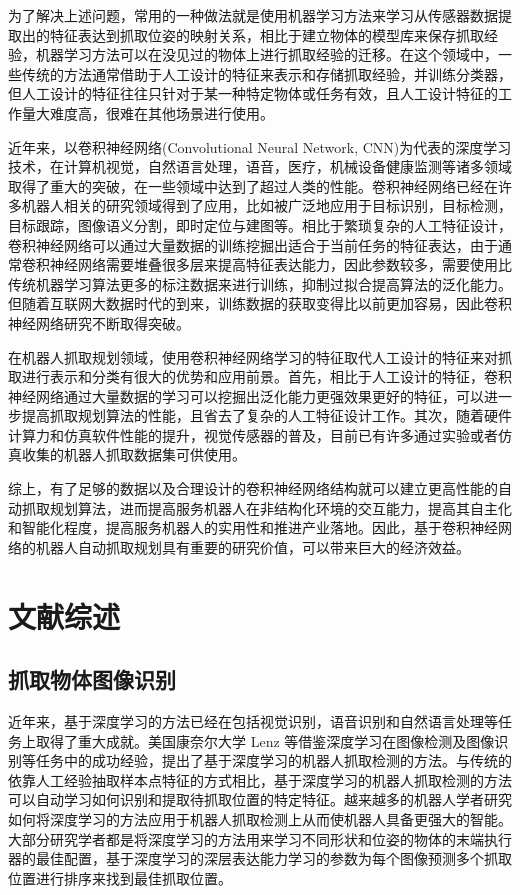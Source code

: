\documentclass[no-math,bwprint]{YangThesis}
\begin{document}
为了解决上述问题，常用的一种做法就是使用机器学习方法来学习从传感器数据提取出的特征表达到抓取位姿的映射关系，相比于建立物体的模型库来保存抓取经验，机器学习方法可以在没见过的物体上进行抓取经验的迁移。在这个领域中，一些传统的方法通常借助于人工设计的特征来表示和存储抓取经验，并训练分类器，但人工设计的特征往往只针对于某一种特定物体或任务有效，且人工设计特征的工作量大难度高，很难在其他场景进行使用。
 
近年来，以卷积神经网络(Convolutional Neural Network, CNN)为代表的深度学习技术，在计算机视觉，自然语言处理，语音，医疗，机械设备健康监测等诸多领域取得了重大的突破，在一些领域中达到了超过人类的性能。卷积神经网络已经在许多机器人相关的研究领域得到了应用，比如被广泛地应用于目标识别，目标检测，目标跟踪，图像语义分割，即时定位与建图等。相比于繁琐复杂的人工特征设计，卷积神经网络可以通过大量数据的训练挖掘出适合于当前任务的特征表达，由于通常卷积神经网络需要堆叠很多层来提高特征表达能力，因此参数较多，需要使用比传统机器学习算法更多的标注数据来进行训练，抑制过拟合提高算法的泛化能力。但随着互联网大数据时代的到来，训练数据的获取变得比以前更加容易，因此卷积神经网络研究不断取得突破。

在机器人抓取规划领域，使用卷积神经网络学习的特征取代人工设计的特征来对抓取进行表示和分类有很大的优势和应用前景。首先，相比于人工设计的特征，卷积神经网络通过大量数据的学习可以挖掘出泛化能力更强效果更好的特征，可以进一步提高抓取规划算法的性能，且省去了复杂的人工特征设计工作。其次，随着硬件计算力和仿真软件性能的提升，视觉传感器的普及，目前已有许多通过实验或者仿真收集的机器人抓取数据集可供使用。
 
综上，有了足够的数据以及合理设计的卷积神经网络结构就可以建立更高性能的自动抓取规划算法，进而提高服务机器人在非结构化环境的交互能力，提高其自主化和智能化程度，提高服务机器人的实用性和推进产业落地。因此，基于卷积神经网络的机器人自动抓取规划具有重要的研究价值，可以带来巨大的经济效益。

\newpage
\section{文献综述}

\subsection{抓取物体图像识别}

近年来，基于深度学习的方法已经在包括视觉识别\cite{bib1,bib2}，语音识别和自然语言处理等任务上取得了重大成就。美国康奈尔大学 Lenz 等\cite{bib3}借鉴深度学习在图像检测及图像识别等任务中的成功经验，提出了基于深度学习的机器人抓取检测的方法\cite{bib3,bib4}。与传统的依靠人工经验抽取样本点特征的方式相比，基于深度学习的机器人抓取检测的方法可以自动学习如何识别和提取待抓取位置的特定特征。越来越多的机器人学者研究如何将深度学习的方法应用于机器人抓取检测上从而使机器人具备更强大的智能。大部分研究学者都是将深度学习的方法用来学习不同形状和位姿的物体的末端执行器的最佳配置，基于深度学习的深层表达能力学习的参数为每个图像预测多个抓取位置进行排序来找到最佳抓取位置。
\end{document}
